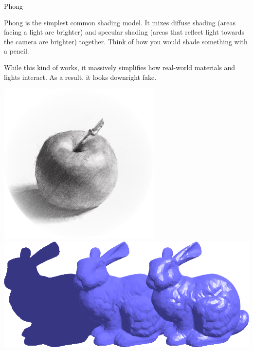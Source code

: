 \documentclass{lug}
\newcommand{\splitslide}[4]{
    \noindent
    \begin{minipage}{#1 \textwidth - #2 }
        #3
    \end{minipage}%
    \hspace{ \dimexpr #2 * 2 \relax }%
    \begin{minipage}{\textwidth - #1 \textwidth - #2 }
        #4
    \end{minipage}
}
\begin{document}
\begin{frame}{Phong}
    \splitslide{0.65}{.7em}{
        \small

        Phong is the simplest common shading model. It mixes diffuse shading
        (areas facing a light are brighter) and specular shading (areas that
        reflect light towards the camera are brighter) together. Think of how
        you would shade something with a pencil.

        \vspace{1ex}

        While this kind of works, it massively simplifies how real-world
        materials and lights interact. As a result, it looks downright fake.

    }{
        \includegraphics[width=\textwidth]{graphics/pencil_phong} \\
        \includegraphics[width=\textwidth]{graphics/phong}
    }
\end{frame}
\end{document}
